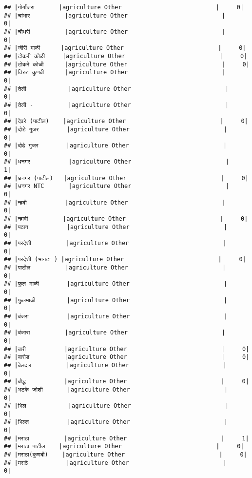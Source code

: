 \documentclass[
]{article}
\begin{document}
\begin{verbatim}
## |गोर्गांजरा       |agriculture Other                           |     0|
## |चांभार          |agriculture Other                           |     0|
## |चौधरी          |agriculture Other                           |     0|
## |जीरी माळी      |agriculture Other                           |     0|
## |टोकरी कोळी     |agriculture Other                           |     0|
## |टोकरे कोळी      |agriculture Other                           |     0|
## |तिरड कुणबी      |agriculture Other                           |     0|
## |तेली            |agriculture Other                           |     0|
## |तेली -          |agriculture Other                           |     0|
## |देवरे (पाटील)    |agriculture Other                           |     0|
## |दोडे गुजर        |agriculture Other                           |     0|
## |दोढे गुजर        |agriculture Other                           |     0|
## |धनगर           |agriculture Other                           |     1|
## |धनगर (पाटील)   |agriculture Other                           |     0|
## |धनगर NTC       |agriculture Other                           |     0|
## |न्हवी           |agriculture Other                           |     0|
## |न्हावी          |agriculture Other                           |     0|
## |पठान           |agriculture Other                           |     0|
## |परदेशी          |agriculture Other                           |     0|
## |परदेशी (भानटा ) |agriculture Other                           |     0|
## |पाटील          |agriculture Other                           |     0|
## |फुल माळी        |agriculture Other                           |     0|
## |फुलमाळी         |agriculture Other                           |     0|
## |बंजरा           |agriculture Other                           |     0|
## |बंजारा          |agriculture Other                           |     0|
## |बारी           |agriculture Other                           |     0|
## |बारोड          |agriculture Other                           |     0|
## |बेलदार          |agriculture Other                           |     0|
## |बौद्ध           |agriculture Other                           |     0|
## |भटके जोशी       |agriculture Other                           |     0|
## |भिल            |agriculture Other                           |     0|
## |भिल्ल           |agriculture Other                           |     0|
## |मराठा          |agriculture Other                           |     1|
## |मराठा पाटील    |agriculture Other                           |     0|
## |मराठा(कुणबी)    |agriculture Other                           |     0|
## |मराठे           |agriculture Other                           |     0|

\end{verbatim}
\end{document}
